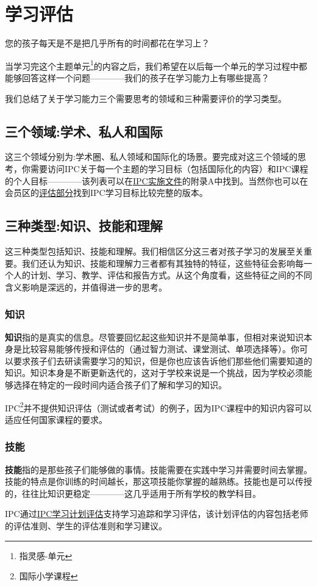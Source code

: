 \chapter{学习评估}
    您的孩子每天是不是把几乎所有的时间都花在学习上？\par
    当学习完这个主题单元\footnote{指灵感-单元}的内容之后，我们希望在以后每一个单元的学习过程中都能够回答这样一个问题————我们的孩子在学习能力上有哪些提高？ \par
    我们总结了关于学习能力三个需要思考的领域和三种需要评价的学习类型。 \par

\section{三个领域:学术、私人和国际}
    这三个领域分别为:学术圈、私人领域和国际化的场景。要完成对这三个领域的思考，你需要访问IPC关于每一个主题的学习目标（包括国际化的内容）和IPC课程的个人目标————该列表可以在\href{https://members.greatlearning.com/ipc/documents?category=31}{IPC实施文件}的附录A中找到。当然你也可以在会员区的\href{https://members.greatlearning.com/ipc/assess/learninggoals}{评估部分}找到IPC学习目标比较完整的版本。


\section{三种类型:知识、技能和理解}
    这三种类型包括知识、技能和理解。我们相信区分这三者对孩子学习的发展至关重要。我们还认为知识、技能和理解力三者都有其独特的特征，这些特征会影响每一个人的计划、学习、教学、评估和报告方式。从这个角度看，这些特征之间的不同含义影响是深远的，并值得进一步的思考。


\subsection{知识}
    \textbf{知识}指的是真实的信息。尽管要回忆起这些知识并不是简单事，但相对来说知识本身是比较容易能够传授和评估的（通过智力测试、课堂测试、单项选择等）。你可以要求孩子们去研读需要学习的知识，但是你也应该告诉他们那些他们需要知道的知识。知识本身是不断更新迭代的，这对于学校来说是一个挑战，因为学校必须能够选择在特定的一段时间内适合孩子们了解和学习的知识。 \par
    IPC\footnote{国际小学课程}并不提供知识评估（测试或者考试）的例子，因为IPC课程中的知识内容可以适应任何国家课程的要求。


\subsection{技能}
    \textbf{技能}指的是那些孩子们能够做的事情。技能需要在实践中学习并需要时间去掌握。技能的特点是你训练的时间越长，那这项技能你掌握的越熟练。技能也是可以传授的，往往比知识更稳定————这几乎适用于所有学校的教学科目。\par
    IPC通过\href{https://members.greatlearning.com/ipc/assess/}{IPC学习计划评估}支持学习追踪和学习评估，该计划评估的内容包括老师的评估准则、学生的评估准则和学习建议。

